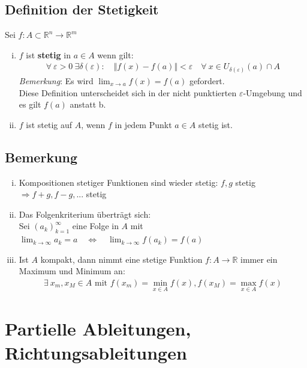 \documentclass[11pt,a4paper]{book}
\newcommand {\R}	{\mathbb{R}}
\newcommand {\Rn}	{\mathbb{R}^n}
\newcommand {\Rm}	{\mathbb{R}^m}
\newcommand{\1}    	{\mathbbm{1}}
\newcommand{\mitt}	{\textrm{ mit }}
\begin{document}
\subsection{Definition der Stetigkeit}
Sei \(f: A \subset \Rn \rightarrow \Rm\)
\begin{enumerate}[(i)]
	\item \(f\) ist \textbf{stetig} in \(a \in A\) wenn gilt:
	\begin{align*}
		\forall~ \varepsilon > 0 ~ \exists \delta(\varepsilon) : \quad \Vert f(x) - f(a) \Vert < \varepsilon \quad \forall~ x \in U_{\delta(\varepsilon)}(a) \cap A
	\end{align*}
	\textit{Bemerkung}: Es wird \( \lim_{x \rightarrow a} f(x) = f(a) \) gefordert. \\
	Diese Definition unterscheidet sich in der nicht punktierten \(\varepsilon\)-Umgebung und es gilt \(f(a)\) anstatt b.
	\item \(f\) ist stetig auf \(A\), wenn \(f\) in jedem Punkt \(a \in A\) stetig ist.
\end{enumerate}

\subsection{Bemerkung}
\begin{enumerate}[(i)]
	\item Kompositionen stetiger Funktionen sind wieder stetig: \(f, g\) stetig \(\Rightarrow f+g, f-g, ...\) stetig
	\item Das Folgenkriterium überträgt sich: \\
	Sei \((a_k)_{k=1}^\infty \) eine Folge in \(A\) mit \(\lim_{k \rightarrow \infty} a_k = a  \quad \Leftrightarrow \quad \lim_{k \rightarrow \infty} f(a_k) = f(a)\)
	\item Ist \(A\) kompakt, dann nimmt eine stetige Funktion \(f : A \rightarrow \R\) immer ein Maximum und Minimum an:
	\begin{align*}
		\exists~ x_m, x_M \in A \mitt f(x_m) = \min_{x \in A} f(x), f(x_M) = \max_{x \in A} f(x)
	\end{align*}
\end{enumerate}

\section{Partielle Ableitungen, Richtungsableitungen}
\end{document}

